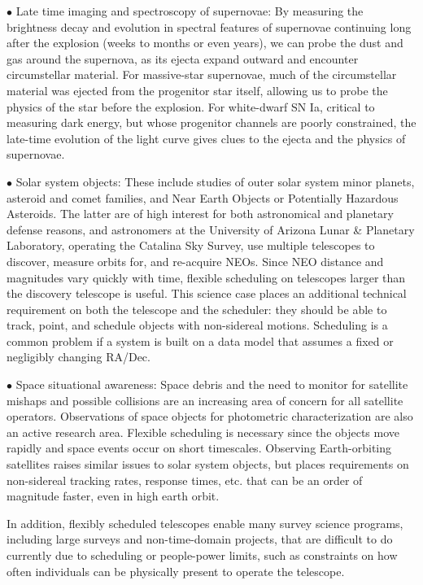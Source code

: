 \documentclass[]{spie}  %
\begin{document}
$\bullet$ Late time imaging and spectroscopy of supernovae: By measuring the brightness decay and evolution in spectral features of supernovae  continuing long after the explosion (weeks to months or even years), we can probe the dust and gas around the supernova, as its ejecta expand outward and encounter circumstellar material\cite{Mauerhan14,Andrews18}. For massive-star supernovae, much of the circumstellar material was ejected from the progenitor star itself, allowing us to probe the physics of the star before the explosion. For white-dwarf SN Ia, critical to measuring dark energy, but whose progenitor channels are poorly constrained, the late-time evolution of the light curve gives clues to the ejecta and the physics of supernovae\cite{Milne15}.

$\bullet$ Solar system objects: These include studies of outer solar system minor planets, asteroid and comet families, and Near Earth Objects or Potentially Hazardous Asteroids.  The latter are of high interest for both astronomical and planetary defense reasons, and astronomers at the University of Arizona Lunar \& Planetary Laboratory, operating the Catalina Sky Survey, use multiple telescopes to discover, measure orbits for, and re-acquire NEOs.  Since NEO distance and magnitudes vary quickly with time, flexible scheduling on telescopes larger than the discovery telescope is useful. This science case places an additional technical requirement on both the telescope and the scheduler: they should be able to track, point, and schedule objects with non-sidereal motions. Scheduling is a common problem if a system is built on a data model that assumes a fixed or negligibly changing RA/Dec.

$\bullet$ Space situational awareness: Space debris and the need to monitor for satellite mishaps and possible collisions are an increasing area of concern for all satellite operators. Observations of space objects for photometric characterization are also an active research area. Flexible scheduling is necessary since the objects move rapidly and space events occur on short timescales. Observing Earth-orbiting satellites raises similar issues to solar system objects, but places requirements on non-sidereal tracking rates, response times, etc. that can be an order of magnitude faster, even in high earth orbit.


In addition, flexibly scheduled telescopes enable many survey science programs, including large surveys and non-time-domain projects, that are difficult to do currently due to scheduling or people-power limits, such as constraints on how often individuals can be physically present to operate the telescope.
\end{document}
